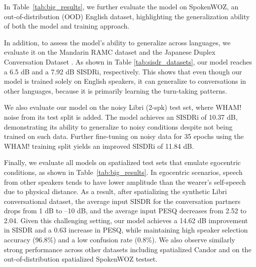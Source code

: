 In Table~\ref{tab:big_results}, we further evaluate the model on SpokenWOZ, an out-of-distribution (OOD) English dataset, highlighting the generalization ability of both the model and training approach.  {In addition, to assess the model’s ability to generalize across languages, we evaluate it on the Mandarin RAMC dataset and the Japanese Duplex Conversation Dataset \cite{JapaneseDuplex2025}. As shown in Table \ref{tab:sisdr_datasets}, our model reaches a 6.5 dB and a 7.92 dB SISDRi, respectively. This shows that even though our model is trained solely on English speakers, it can generalize  to conversations in other languages, because it is primarily learning the turn-taking patterns. 

We also evaluate our model on the noisy Libri (2-spk) test set, where WHAM! noise from its test split is added. The model achieves an SISDRi of 10.37 dB, demonstrating its ability to generalize to noisy conditions despite not being trained on such data. Further fine-tuning on noisy data for 35 epochs using the WHAM! training split yields an improved SISDRi of 11.84 dB.



Finally, we  evaluate all models on spatialized test sets that emulate egocentric  conditions, as shown in Table~\ref{tab:big_results}. In egocentric scenarios, speech from other speakers tends to have lower amplitude than the wearer’s self-speech due to physical distance. As a result, after spatializing the synthetic Libri conversational dataset, the average input SISDR for the conversation partners drops from 1 dB to –10 dB, and the average input PESQ decreases from 2.52 to 2.04.
Given this challenging setting, our model achieves a 14.62 dB improvement in SISDR and a 0.63 increase in PESQ, while maintaining high speaker selection accuracy (96.8\%) and a low confusion rate (0.8\%). We also observe similarly strong performance across other  datasets including spatialized Candor and on the out-of-distribution spatialized SpokenWOZ testset. %


}
